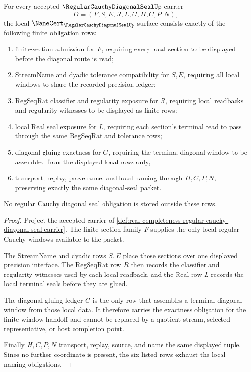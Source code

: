 \begin{theorem}
\label{thm:real-completeness-regular-cauchy-diagonal-seal-obligations}
For every accepted $\RegularCauchyDiagonalSealUp$ carrier
$$
D=(F,S,E,R,L,G,H,C,P,N),
$$
the local $\NameCert_{\RegularCauchyDiagonalSealUp}$ surface consists exactly of the following finite obligation rows:
\begin{enumerate}
\item finite-section admission for $F$, requiring every local section to be displayed before the diagonal route is read;
\item StreamName and dyadic tolerance compatibility for $S,E$, requiring all local windows to share the recorded precision ledger;
\item RegSeqRat classifier and regularity exposure for $R$, requiring local readbacks and regularity witnesses to be displayed as finite rows;
\item local Real seal exposure for $L$, requiring each section's terminal read to pass through the same RegSeqRat and tolerance rows;
\item diagonal gluing exactness for $G$, requiring the terminal diagonal window to be assembled from the displayed local rows only;
\item transport, replay, provenance, and local naming through $H,C,P,N$, preserving exactly the same diagonal-seal packet.
\end{enumerate}
No regular Cauchy diagonal seal obligation is stored outside these rows.
\end{theorem}
\begin{proof}
Project the accepted carrier of \autoref{def:real-completeness-regular-cauchy-diagonal-seal-carrier}. The finite section family $F$ supplies the only local regular-Cauchy windows available to the packet.

The StreamName and dyadic rows $S,E$ place those sections over one displayed precision interface. The RegSeqRat row $R$ then records the classifier and regularity witnesses used by each local readback, and the Real row $L$ records the local terminal seals before they are glued.

The diagonal-gluing ledger $G$ is the only row that assembles a terminal diagonal window from those local data. It therefore carries the exactness obligation for the finite-window handoff and cannot be replaced by a quotient stream, selected representative, or host completion point.

Finally $H,C,P,N$ transport, replay, source, and name the same displayed tuple. Since no further coordinate is present, the six listed rows exhaust the local naming obligations.
\end{proof}

